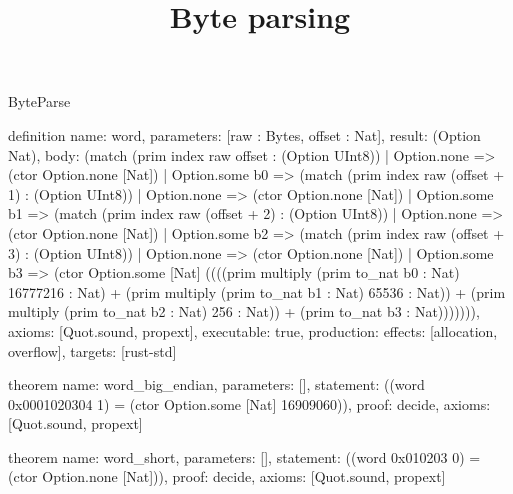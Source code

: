 \begin{lexlean}{ByteParse}
\title{Byte parsing}
\begin{semanticmodule}
definition{
  name: word,
  parameters: [raw : Bytes, offset : Nat],
  result: (Option Nat),
  body: (match (prim index raw offset : (Option UInt8))
    | Option.none => (ctor Option.none [Nat])
    | Option.some b0 => (match (prim index raw (offset + 1) : (Option UInt8))
      | Option.none => (ctor Option.none [Nat])
      | Option.some b1 => (match (prim index raw (offset + 2) : (Option UInt8))
        | Option.none => (ctor Option.none [Nat])
        | Option.some b2 => (match (prim index raw (offset + 3) : (Option UInt8))
          | Option.none => (ctor Option.none [Nat])
          | Option.some b3 => (ctor Option.some [Nat] ((((prim multiply (prim to_nat b0 : Nat) 16777216 : Nat) + (prim multiply (prim to_nat b1 : Nat) 65536 : Nat)) + (prim multiply (prim to_nat b2 : Nat) 256 : Nat)) + (prim to_nat b3 : Nat))))))),
  axioms: [Quot.sound, propext],
  executable: true,
  production: {effects: [allocation, overflow], targets: [rust-std]}
}

theorem{
  name: word_big_endian,
  parameters: [],
  statement: ((word 0x0001020304 1) = (ctor Option.some [Nat] 16909060)),
  proof: decide{},
  axioms: [Quot.sound, propext]
}

theorem{
  name: word_short,
  parameters: [],
  statement: ((word 0x010203 0) = (ctor Option.none [Nat])),
  proof: decide{},
  axioms: [Quot.sound, propext]
}
\end{semanticmodule}
\end{lexlean}
